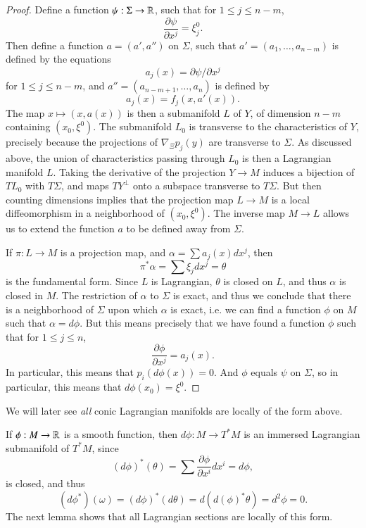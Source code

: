 \begin{proof}
    Define a function $\psi: \Sigma \to \operatorname{\mathbb{R}}$, such that for $1 \leq j \leq n-m$,
    \[ \frac{\partial \psi}{\partial x^j} = \xi^0_j. \]
    Then define a function $a = (a',a'')$ on $\Sigma$, such that $a' = (a_1,\dots,a_{n-m})$ is defined by the equations
    \[ a_j(x) = \partial \psi / \partial x^j \]
    for $1 \leq j \leq n-m$, and $a'' = (a_{n-m+1}, \dots, a_n)$ is defined by
    \[ a_j(x) = f_j(x,a'(x)). \]
    The map $x \mapsto (x,a(x))$ is then a submanifold $L$ of $Y$, of dimension $n-m$ containing $(x_0,\xi^0)$. The submanifold $L_0$ is transverse to the characteristics of $Y$, precisely because the projections of $\nabla_\Xi p_j(y)$ are transverse to $\Sigma$. As discussed above, the union of characteristics passing through $L_0$ is then a Lagrangian manifold $L$. Taking the derivative of the projection $Y \to M$ induces a bijection of $TL_0$ with $T\Sigma$, and maps $TY^\perp$ onto a subspace transverse to $T\Sigma$. But then counting dimensions implies that the projection map $L \to M$ is a local diffeomorphism in a neighborhood of $(x_0,\xi^0)$. The inverse map $M \to L$ allows us to extend the function $a$ to be defined away from $\Sigma$.

    If $\pi: L \to M$ is a projection map, and $\alpha = \sum a_j(x) dx^j$, then
    \[ \pi^* \alpha = \sum \xi_j dx^j = \theta \]
    is the fundamental form. Since $L$ is Lagrangian, $\theta$ is closed on $L$, and thus $\alpha$ is closed in $M$. The restriction of $\alpha$ to $\Sigma$ is exact, and thus we conclude that there is a neighborhood of $\Sigma$ upon which $\alpha$ is exact, i.e. we can find a function $\phi$ on $M$ such that $\alpha = d\phi$. But this means precisely that we have found a function $\phi$ such that for $1 \leq j \leq n$,
    \[ \frac{\partial \phi}{\partial x^j} = a_j(x). \]
    In particular, this means that $p_i(d \phi(x)) = 0$. And $\phi$ equals $\psi$ on $\Sigma$, so in particular, this means that $d\phi(x_0) = \xi^0$.
\end{proof}



We will later see \emph{all} conic Lagrangian manifolds are locally of the form above.

\begin{example}
    If $\phi: M \to \operatorname{\mathbb{R}}$ is a smooth function, then $d\phi: M \to T^* M$ is an immersed Lagrangian submanifold of $T^* M$, since
    \[ (d\phi)^*(\theta) = \sum \frac{\partial \phi}{\partial x^i} dx^i = d\phi, \]
    is closed, and thus
    \[ (d\phi^*)(\omega) = (d\phi)^*(d \theta) = d(d(\phi)^* \theta) = d^2 \phi = 0. \]
    The next lemma shows that all Lagrangian sections are locally of this form.
\end{example}

